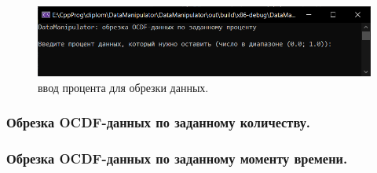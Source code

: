 {\standartFont
  
\begin{figure}[H]
  \centering
  \includegraphics{images/OCDFcutpercentstage1.png}
  \caption{ввод процента для обрезки данных.} 
  \label{fig:OCDFcutper1}
\end{figure}

}

\subsubsection{ \standartTitleFont
  Обрезка OCDF-данных по заданному количеству. 
} 

\subsubsection{ \standartTitleFont
  Обрезка OCDF-данных по заданному моменту времени. 
} 